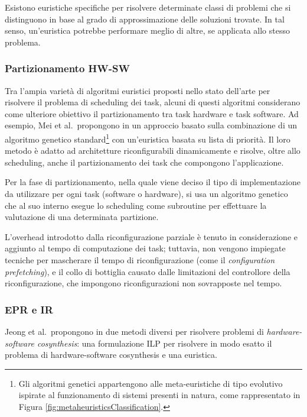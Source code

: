 Esistono euristiche specifiche per risolvere determinate classi di problemi che 
si distinguono in base al grado di approssimazione delle soluzioni trovate. 
In tal senso, un'euristica potrebbe performare meglio di altre, se applicata 
allo stesso problema.

\subsubsection{Partizionamento HW-SW}
Tra l'ampia varietà di algoritmi euristici proposti nello stato dell'arte per 
risolvere il problema di scheduling dei task, alcuni di questi algoritmi 
considerano come ulteriore obiettivo il partizionamento tra task hardware e 
task software. Ad esempio, Mei et al.~propongono in 
\cite{MeiPartitioningScheduling} un approccio basato sulla combinazione di un 
algoritmo genetico standard\footnote{Gli algoritmi genetici appartengono alle 
meta-euristiche di tipo evolutivo ispirate al funzionamento di sistemi presenti 
in natura, come rappresentato in Figura 
\ref{fig:metaheuristicsClassification}.} con un'euristica basata su lista di 
priorità. Il loro metodo è adatto ad architetture riconfigurabili dinamicamente 
e risolve, oltre allo scheduling, anche il partizionamento dei task che 
compongono l'applicazione.

Per la fase di partizionamento, nella quale viene deciso il tipo 
di implementazione da utilizzare per ogni task (software o hardware), si usa un 
algoritmo genetico che al suo interno esegue lo scheduling come subroutine per 
effettuare la valutazione di una determinata partizione.


L'overhead introdotto dalla riconfigurazione parziale è tenuto in 
considerazione e aggiunto al tempo di computazione dei task; tuttavia, non 
vengono impiegate tecniche per mascherare il tempo di riconfigurazione (come il 
\emph{configuration prefetching}), e il collo di bottiglia causato dalle 
limitazioni del controllore della riconfigurazione, che impongono 
riconfigurazioni non sovrapposte nel tempo.


\subsubsection{\acl{EPR} e \acl{IR}}
Jeong et al.~propongono in \cite{JeongHWSWCosynthesis} due metodi diversi per 
risolvere problemi di \emph{hardware-software cosynthesis}: una formulazione 
\ac{ILP} per risolvere in modo esatto il problema di hardware-software 
cosynthesis e una euristica.


